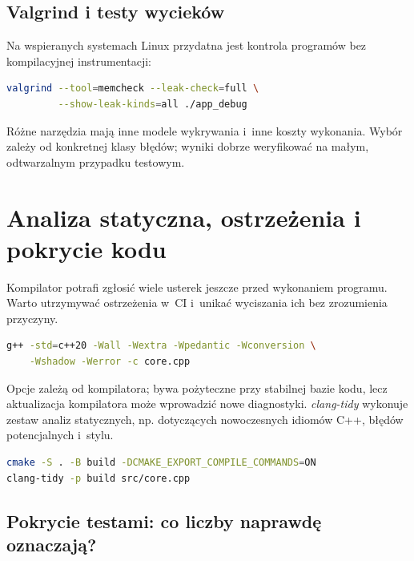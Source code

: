 \subsection{Valgrind i testy wycieków}

Na wspieranych systemach Linux przydatna jest kontrola programów
bez kompilacyjnej instrumentacji:

\begin{lstlisting}[language=bash,caption={Przykladowe badanie pamieci przez Valgrind Memcheck.}]
valgrind --tool=memcheck --leak-check=full \
         --show-leak-kinds=all ./app_debug
\end{lstlisting}

Różne narzędzia mają inne modele wykrywania i~inne koszty
wykonania. Wybór zależy od konkretnej klasy błędów; wyniki dobrze
weryfikować na małym, odtwarzalnym przypadku testowym.

\section{Analiza statyczna, ostrzeżenia i pokrycie kodu}
\label{sec:cpp18-static}

Kompilator potrafi zgłosić wiele usterek jeszcze przed wykonaniem
programu. Warto utrzymywać ostrzeżenia w~CI i~unikać wyciszania ich
bez zrozumienia przyczyny.

\begin{lstlisting}[language=bash,caption={Przykladowe ostrzezenia GCC/Clang.}]
g++ -std=c++20 -Wall -Wextra -Wpedantic -Wconversion \
    -Wshadow -Werror -c core.cpp
\end{lstlisting}

Opcje zależą od kompilatora;  bywa pożyteczne przy
stabilnej bazie kodu, lecz aktualizacja kompilatora może wprowadzić
nowe diagnostyki. \emph{clang-tidy} wykonuje zestaw analiz
statycznych, np. dotyczących nowoczesnych idiomów C++, błędów
potencjalnych i~stylu.

\begin{lstlisting}[language=bash,caption={Analiza projektu ze zbiorem komend kompilacji.}]
cmake -S . -B build -DCMAKE_EXPORT_COMPILE_COMMANDS=ON
clang-tidy -p build src/core.cpp
\end{lstlisting}

\subsection{Pokrycie testami: co liczby naprawdę oznaczają?}

